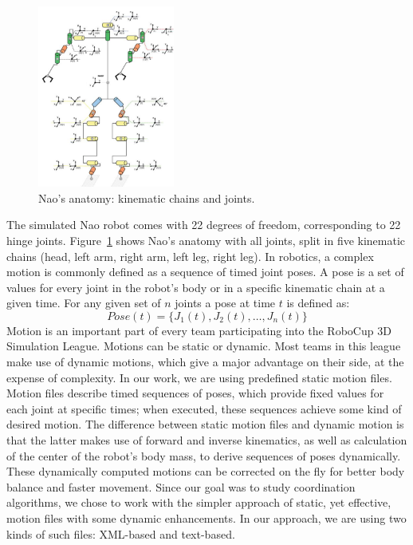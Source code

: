 \begin{figure}[t!]
\centering
  \includegraphics[width=0.4\textwidth]{Chapter3/figures/Models_NaoAnatomy.png}
  \caption{Nao's anatomy: kinematic chains and joints.}
  \label{fig:NaoAnatomy}
\end{figure}

The simulated Nao robot comes with 22 degrees of freedom, corresponding to 22 hinge joints. Figure~\ref{fig:NaoAnatomy} shows Nao's anatomy with all joints, split in five kinematic chains (head, left arm, right arm, left leg, right leg).
In robotics, a complex motion is commonly defined as a sequence of timed joint poses. A pose is a set of values for every joint in the robot's body or in a specific kinematic chain at a given time. 
For any given set of $n$ joints a pose at time $t$ is defined as:
\[
Pose(t)= \lbrace J_{1}(t), J_{2}(t), \ldots ,J_{n}(t) \rbrace
\]
Motion is an important part of every team participating into the RoboCup 3D Simulation League. Motions can be static or dynamic. Most teams in this league make use of dynamic motions, which give a major advantage on their side, at the expense of complexity. In our work, we are using predefined static motion files. Motion files describe timed sequences of poses, which provide fixed values for each joint at specific times; when executed, these sequences achieve some kind of desired motion. The difference between static motion files and dynamic motion is that the latter makes use of forward and inverse kinematics, as well as calculation of the center of the robot's body mass, to derive sequences of poses dynamically. These dynamically computed motions can be corrected on the fly for better body balance and faster movement. Since our goal was to study coordination algorithms, we chose to work with the simpler approach of static, yet effective, motion files with some dynamic enhancements. In our approach, we are using two kinds of such files: XML-based and text-based.


